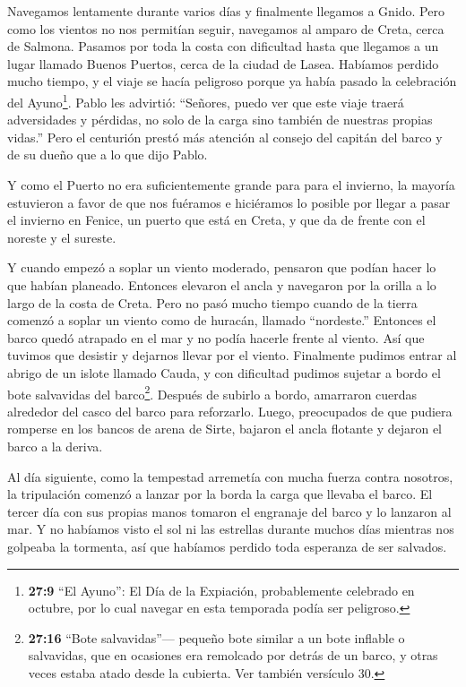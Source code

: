  Navegamos lentamente durante varios días y finalmente
llegamos a Gnido. Pero como los vientos no nos permitían seguir,
navegamos al amparo de Creta, cerca de Salmona.  Pasamos por
toda la costa con dificultad hasta que llegamos a un lugar llamado
Buenos Puertos, cerca de la ciudad de Lasea.  Habíamos
perdido mucho tiempo, y el viaje se hacía peligroso porque ya había
pasado la celebración del Ayuno\footnote{\textbf{27:9} ``El Ayuno'': El
  Día de la Expiación, probablemente celebrado en octubre, por lo cual
  navegar en esta temporada podía ser peligroso.}. Pablo les advirtió:
 ``Señores, puedo ver que este viaje traerá adversidades y
pérdidas, no solo de la carga sino también de nuestras propias vidas.''
 Pero el centurión prestó más atención al consejo del
capitán del barco y de su dueño que a lo que dijo Pablo.

 Y como el Puerto no era suficientemente grande para para
el invierno, la mayoría estuvieron a favor de que nos fuéramos e
hiciéramos lo posible por llegar a pasar el invierno en Fenice, un
puerto que está en Creta, y que da de frente con el noreste y el
sureste.

 Y cuando empezó a soplar un viento moderado, pensaron que
podían hacer lo que habían planeado. Entonces elevaron el ancla y
navegaron por la orilla a lo largo de la costa de Creta. 
Pero no pasó mucho tiempo cuando de la tierra comenzó a soplar un viento
como de huracán, llamado ``nordeste.''  Entonces el barco
quedó atrapado en el mar y no podía hacerle frente al viento. Así que
tuvimos que desistir y dejarnos llevar por el viento. 
Finalmente pudimos entrar al abrigo de un islote llamado Cauda, y con
dificultad pudimos sujetar a bordo el bote salvavidas del
barco\footnote{\textbf{27:16} ``Bote salvavidas''--- pequeño bote
  similar a un bote inflable o salvavidas, que en ocasiones era
  remolcado por detrás de un barco, y otras veces estaba atado desde la
  cubierta. Ver también versículo 30.}.  Después de subirlo
a bordo, amarraron cuerdas alrededor del casco del barco para
reforzarlo. Luego, preocupados de que pudiera romperse en los bancos de
arena de Sirte, bajaron el ancla flotante y dejaron el barco a la
deriva.

 Al día siguiente, como la tempestad arremetía con mucha
fuerza contra nosotros, la tripulación comenzó a lanzar por la borda la
carga que llevaba el barco.  El tercer día con sus propias
manos tomaron el engranaje del barco y lo lanzaron al mar. 
Y no habíamos visto el sol ni las estrellas durante muchos días mientras
nos golpeaba la tormenta, así que habíamos perdido toda esperanza de ser
salvados.


